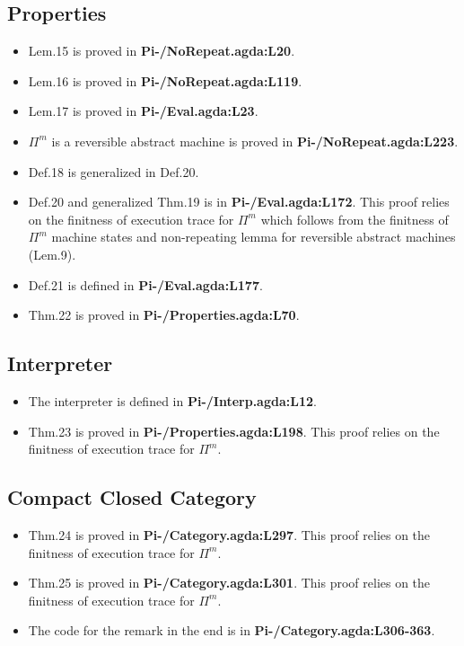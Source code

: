 \documentclass{article}
\begin{document}
\subsection{Properties}
\begin{itemize}
\item Lem.15 is proved in \textbf{Pi-/NoRepeat.agda:L20}.
\item Lem.16 is proved in \textbf{Pi-/NoRepeat.agda:L119}.
\item Lem.17 is proved in \textbf{Pi-/Eval.agda:L23}.
\item $\Pi^m$ is a reversible abstract machine is proved in \textbf{Pi-/NoRepeat.agda:L223}.
\item Def.18 is generalized in Def.20.
\item Def.20 and generalized Thm.19 is in \textbf{Pi-/Eval.agda:L172}. This proof relies on the finitness of execution trace
  for $\Pi^m$ which follows from the finitness of $\Pi^m$ machine states and non-repeating lemma for reversible abstract
  machines (Lem.9).
\item Def.21 is defined in \textbf{Pi-/Eval.agda:L177}.
\item Thm.22 is proved in \textbf{Pi-/Properties.agda:L70}.
\end{itemize}

\subsection{Interpreter}
\begin{itemize}
\item The interpreter is defined in \textbf{Pi-/Interp.agda:L12}.
\item Thm.23 is proved in \textbf{Pi-/Properties.agda:L198}. This proof relies on the finitness of execution trace
  for $\Pi^m$.
\end{itemize}

\subsection{Compact Closed Category}
\begin{itemize}
\item Thm.24 is proved in \textbf{Pi-/Category.agda:L297}. This proof relies on the finitness of execution trace
  for $\Pi^m$.
\item Thm.25 is proved in \textbf{Pi-/Category.agda:L301}. This proof relies on the finitness of execution trace
  for $\Pi^m$.
\item The code for the remark in the end is in \textbf{Pi-/Category.agda:L306-363}.
\end{itemize}
\end{document}
